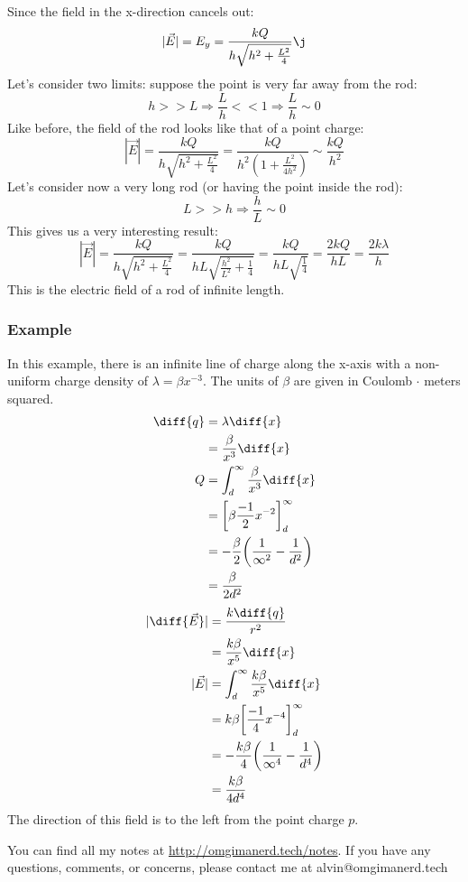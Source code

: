\documentclass{math}
\begin{document}
Since the field in the x-direction cancels out:
\[ |\vec{E}| = E_y = \frac{kQ}{h\sqrt{h^2+\frac{L^2}{4}}}\j \]
Let's consider two limits: suppose the point is very far away from the rod:
\[ h >> L \Rightarrow \frac{L}{h} << 1 \Rightarrow \frac{L}{h}\sim 0 \]
Like before, the field of the rod looks like that of a point charge:
\[ |\vec{E}| = \frac{kQ}{h\sqrt{h^2+\frac{L^2}{4}}} =
  \frac{kQ}{h^2(1+\frac{L^2}{4h^2})} \sim \frac{kQ}{h^2} \]
Let's consider now a very long rod (or having the point inside the rod):
\[ L >> h \Rightarrow \frac{h}{L} \sim 0 \]
This gives us a very interesting result:
\[ |\vec{E}| = \frac{kQ}{h\sqrt{h^2+\frac{L^2}{4}}} =
  \frac{kQ}{hL\sqrt{\frac{h^2}{L^2}+\frac{1}{4}}} =
  \frac{kQ}{hL\sqrt{\frac{1}{4}}} = \frac{2kQ}{hL} = \frac{2k\lambda}{h} \]
This is the electric field of a rod of infinite length.

\subsubsection*{Example}
\begin{center}
\end{center}
In this example, there is an infinite line of charge along the x-axis with a
non-uniform charge density of \( \lambda = \beta x^{-3} \). The units of
\( \beta \) are given in Coulomb \( \cdot \) meters squared.
\begin{align*}
  \diff{q} &= \lambda\diff{x} \\
  &= \frac{\beta}{x^3}\diff{x} \\
  Q &= \int_{d}^{\infty}\frac{\beta}{x^3}\diff{x} \\
  &= \bigg[\beta\frac{-1}{2}x^{-2}\bigg]_{d}^{\infty} \\
  &= -\frac{\beta}{2}\bigg(\frac{1}{\infty^2}-\frac{1}{d^2}\bigg) \\
  &= \frac{\beta}{2d^2} \\
\end{align*}
\begin{align*}
  |\diff{\vec{E}}| &= \frac{k\diff{q}}{r^2} \\
  &= \frac{k\beta}{x^5}\diff{x} \\
  |\vec{E}| &= \int_{d}^{\infty}\frac{k\beta}{x^5}\diff{x} \\
  &= k\beta\bigg[\frac{-1}{4}x^{-4}\bigg]_{d}^{\infty} \\
  &= -\frac{k\beta}{4}\bigg(\frac{1}{\infty^4}-\frac{1}{d^4}\bigg) \\
  &= \frac{k\beta}{4d^4}
\end{align*}
The direction of this field is to the left from the point charge \( p \).

\begin{center}
  You can find all my notes at \url{http://omgimanerd.tech/notes}. If you have
  any questions, comments, or concerns, please contact me at
  alvin@omgimanerd.tech
\end{center}
\end{document}

